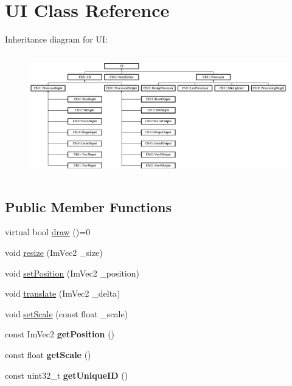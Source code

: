 \hypertarget{class_u_i}{}\section{UI Class Reference}
\label{class_u_i}
Inheritance diagram for UI\+:\begin{figure}[H]
\begin{center}
\leavevmode
\includegraphics[height=5.369127cm]{class_u_i}
\end{center}
\end{figure}
\subsection*{Public Member Functions}
\begin{DoxyCompactItemize}
\item 
virtual bool \mbox{\hyperlink{class_u_i_a5025b88e26f21852c0cd2e4b42675c50}{draw}} ()=0
\item 
void \mbox{\hyperlink{class_u_i_a934f9deb6d5b34dfe7e510fcecab9331}{resize}} (Im\+Vec2 \+\_\+size)
\item 
void \mbox{\hyperlink{class_u_i_a3613f4288872eb4498a74929f7923144}{set\+Position}} (Im\+Vec2 \+\_\+position)
\item 
void \mbox{\hyperlink{class_u_i_a45f75304b2c3fbea67c846709a5fc3d6}{translate}} (Im\+Vec2 \+\_\+delta)
\item 
void \mbox{\hyperlink{class_u_i_a9f94b46f9c35e31475bfbf1b3d3509d4}{set\+Scale}} (const float \+\_\+scale)
\item 
\mbox{\label{class_u_i_a5ee541a0fdace105e3a1b4ac75d09ec0}} 
const Im\+Vec2 {\bfseries get\+Position} ()
\item 
\mbox{\label{class_u_i_af2544c74b9a04087864de2a7c7915f82}} 
const float {\bfseries get\+Scale} ()
\item 
\mbox{\label{class_u_i_afd4f0491687ee2c20c15c83f1faf8001}} 
const uint32\+\_\+t {\bfseries get\+Unique\+ID} ()
\end{DoxyCompactItemize}

